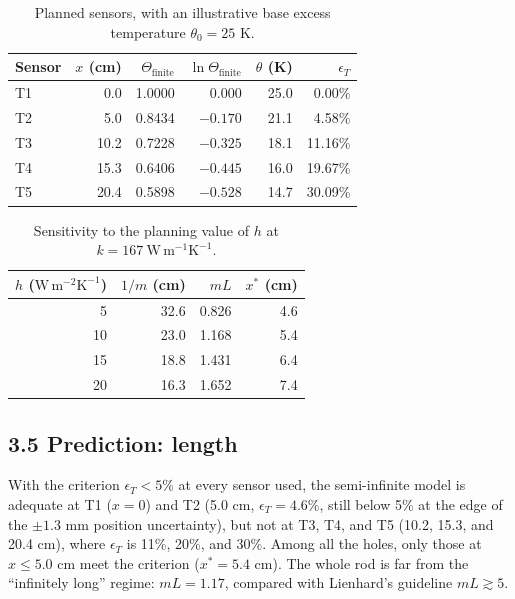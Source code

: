 \documentclass[reprint, amsmath, amssymb, aps, prl]{revtex4-2}
\newcommand{\WmK}{\mathrm{W\,m^{-1}K^{-1}}}
\newcommand{\WmmK}{\mathrm{W\,m^{-2}K^{-1}}}
\begin{document}
\begin{table}[t]
\caption{\label{tab:sensors}Planned sensors, with an illustrative base excess temperature
$\theta_0=25$ K.}
\begin{ruledtabular}
\begin{tabular}{lrrrrr}
Sensor & $x$ (cm) & $\Theta_{\mathrm{finite}}$ & $\ln\Theta_{\mathrm{finite}}$ & $\theta$ (K) & $\epsilon_T$ \\
\hline
T1 & 0.0 & 1.0000 & 0.000 & 25.0 & 0.00\% \\
T2 & 5.0 & 0.8434 & $-0.170$ & 21.1 & 4.58\% \\
T3 & 10.2 & 0.7228 & $-0.325$ & 18.1 & 11.16\% \\
T4 & 15.3 & 0.6406 & $-0.445$ & 16.0 & 19.67\% \\
T5 & 20.4 & 0.5898 & $-0.528$ & 14.7 & 30.09\% \\
\end{tabular}
\end{ruledtabular}
\end{table}

\begin{table}[t]
\caption{\label{tab:hsens}Sensitivity to the planning value of $h$ at $k=167~\WmK$.}
\begin{ruledtabular}
\begin{tabular}{rrrr}
$h$ ($\WmmK$) & $1/m$ (cm) & $mL$ & $x^{\ast}$ (cm) \\
\hline
5 & 32.6 & 0.826 & 4.6 \\
10 & 23.0 & 1.168 & 5.4 \\
15 & 18.8 & 1.431 & 6.4 \\
20 & 16.3 & 1.652 & 7.4 \\
\end{tabular}
\end{ruledtabular}
\end{table}

\subsection*{3.5 Prediction: length}

With the criterion $\epsilon_T<5\%$ at every sensor used, the semi-infinite model is
adequate at T1 ($x=0$) and T2 (5.0 cm, $\epsilon_T=4.6\%$, still below 5\% at the edge of
the $\pm1.3$ mm position uncertainty), but not at T3, T4, and T5 (10.2, 15.3, and
20.4 cm), where $\epsilon_T$ is 11\%, 20\%, and 30\%. Among all the holes, only those at
$x\le5.0$ cm meet the criterion ($x^{\ast}=5.4$ cm). The whole rod is far from the
``infinitely long'' regime: $mL=1.17$, compared with Lienhard's guideline $mL\gtrsim5$.
\end{document}
